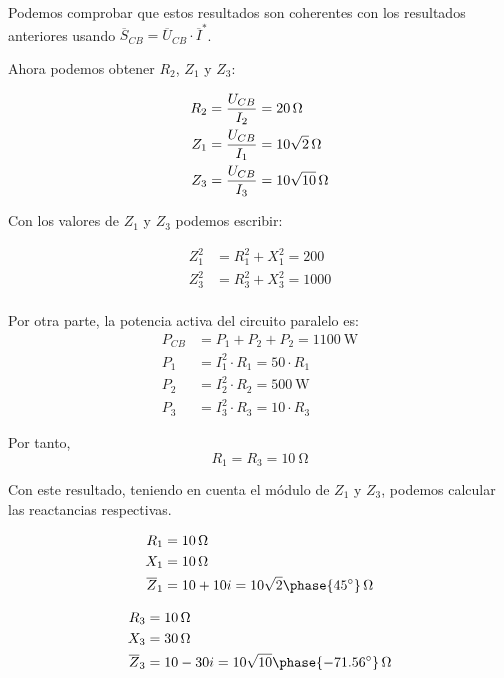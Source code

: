 Podemos comprobar que estos resultados son coherentes con los
resultados anteriores usando $\overline{S}_{CB} = \overline{U}_{CB}
\cdot \overline{I}^*$.


Ahora podemos obtener $R_2$, $Z_1$ y $Z_3$:

\begin{align*}
  R_2 &= \frac{U_{CB}}{I_2} = \qty{20}{\ohm}\\
  Z_1 &= \frac{U_{CB}}{I_1} = \qty[parse-numbers=false]{10\sqrt{2}}{\ohm}\\
  Z_3 &= \frac{U_{CB}}{I_3} = \qty[parse-numbers=false]{10\sqrt{10}}{\ohm}
\end{align*}

Con los valores de $Z_1$ y $Z_3$ podemos escribir:

\begin{align*}
  Z_1^2 &= R_1^2 + X_1^2 = 200\\
  Z_3^2 &= R_3^2 + X_3^2 = 1000\\
\end{align*}

Por otra parte, la potencia activa del circuito paralelo es:
\begin{align*}
  P_{CB} &= P_1 + P_2 + P_2 =\qty{1100}{\watt}\\
  P_1 &= I_1^2 \cdot R_1 = 50 \cdot R_1\\
  P_2 &= I_2^2 \cdot R_2 = \qty{500}{\watt}\\
  P_3 &= I_3^2 \cdot R_3 = 10 \cdot R_3
\end{align*}

Por tanto, 
\[
   R_1 = R_3 = \qty{10}{\ohm}              
\]

Con este resultado, teniendo en cuenta el módulo de $Z_1$ y $Z_3$,
podemos calcular las reactancias respectivas.

\begin{align*}
  R_1 &= \qty{10}{\ohm}\\
  X_1 &= \qty{10}{\ohm}\\
  \overline{Z}_1 &= 10 + 10i = \qty[parse-numbers=false]{10\sqrt{2}\phase{\ang{45}}}{\ohm}
\end{align*}

\begin{align*}
  R_3 &= \qty{10}{\ohm}\\
  X_3 &= \qty{30}{\ohm}\\
  \overline{Z}_3 &= 10 - 30i = \qty[parse-numbers=false]{10\sqrt{10}\phase{\ang{-71.56}}}{\ohm}
\end{align*}

